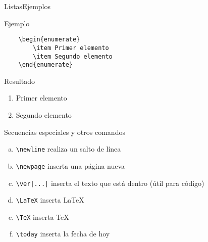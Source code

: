 \documentclass[10pt,xcolor={dvipsnames}]{beamer}
\begin{document}
\begin{frame}[fragile]{Listas}{Ejemplos}
\begin{exampleblock}{Ejemplo}
	\begin{verbatim}
	\begin{enumerate}
		\item Primer elemento
		\item Segundo elemento
	\end{enumerate}
	\end{verbatim}
\end{exampleblock}

\begin{block}{Resultado}
	\begin{enumerate}
		\item Primer elemento
		\item Segundo elemento
	\end{enumerate}
\end{block}
\end{frame}

\begin{frame}{Secuencias especiales y otros comandos}
	\begin{enumerate}[a)]
		\item {\tt\textbackslash newline} realiza un salto de línea
		\item {\tt\textbackslash newpage} inserta una página nueva
		\item {\tt\textbackslash ver|...|} inserta el texto que está dentro (útil para código)
		\item {\tt\textbackslash LaTeX} inserta \LaTeX
		\item {\tt\textbackslash TeX} inserta \TeX 
		\item {\tt\textbackslash today} inserta la fecha de hoy
	\end{enumerate}
\end{frame}

{\1
\begin{frame}
\end{frame}}
\end{document}
